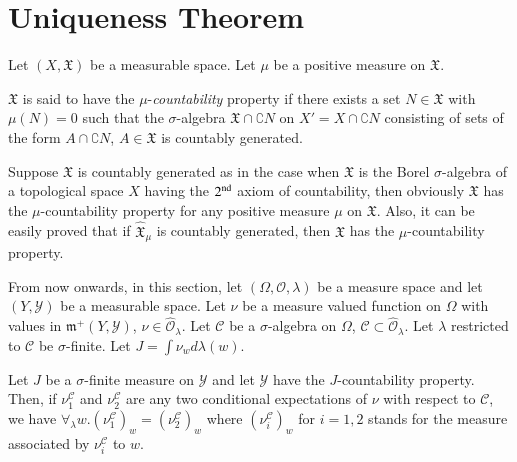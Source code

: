 \section{Uniqueness Theorem}\label{part1:chap3:sec3}

Let $(X, \mathfrak{X})$ be a measurable space. Let $\mu$ be a positive
measure on $\mathfrak{X}$. 

\begin{defn}\label{part1:chap3:def35}
$\mathfrak{X}$ is said to have the $\mu$-{\em countability} property
  if there exists a set $N\in \mathfrak{X}$ with $\mu(N) = 0$ such
  that the $\sigma$-algebra $\mathfrak{X}\cap \complement N$ on $X' =
  X \cap \complement N$ consisting of sets of the form $A \cap
  \complement N$, $A \in \mathfrak{X}$ is countably generated. 
\end{defn}

\begin{examples*}
Suppose $\mathfrak{X}$ is countably generated as in the case when
$\mathfrak{X}$ is the Borel $\sigma$-algebra of a topological space
$X$ having the $2^{\rm nd}$ axiom of countability, then obviously
$\mathfrak{X}$ has the $\mu$-countability property for any positive
measure $\mu$ on $\mathfrak{X}$. Also, it can be easily proved that if
$\hat{\mathfrak{X}}_\mu$  is countably generated, then $\mathfrak{X}$
has the $\mu$-countability property. 
\end{examples*}


From now onwards, in this section, let $(\Omega, \mathscr{O},
\lambda)$ be a measure space and let $(Y, \mathscr{Y})$ be a
measurable space. Let $\nu$ be a measure valued function on $\Omega$
with values in $\mathfrak{m}^+ (Y, \mathscr{Y})$, $\nu \in
\hat{\mathscr{O}}_\lambda$. Let $\mathscr{C}$ be a $\sigma$-algebra
on $\Omega$, $\mathscr{C} \subset \hat{\mathscr{O}}_\lambda$. Let
$\lambda$ restricted to $\mathscr{C}$ be $\sigma$-finite. Let $J =
\int \nu_w d \lambda(w)$. 

\begin{thm}\label{part1:chap3:thm36}
Let $J$ be a $\sigma$-finite measure on $\mathscr{Y}$ and let
$\mathscr{Y}$ have the $J$-countability property. Then, if
$\nu^\mathscr{C}_1$ and $\nu^\mathscr{C}_2$ are any two conditional
expectations of $\nu$ with respect to $\mathscr{C}$, we have
$\forall_\lambda w. (\nu^\mathscr{C}_1)_w = (\nu^\mathscr{C}_2)_w$
where $(\nu^\mathscr{C}_i)_w$ for $i = 1,2$ stands for the measure
associated by $\nu^\mathscr{C}_i$ to $w$. 
\end{thm}

